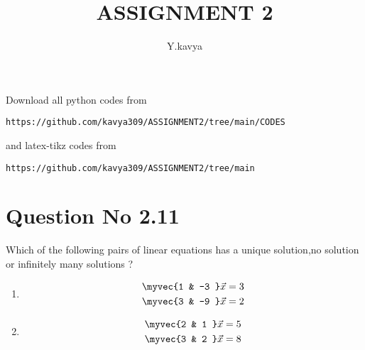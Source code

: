 \documentclass[journal,12pt,twocolumn]{IEEEtran}
\begin{document}
     \def\rightbox#1{\makebox[0in][r]{#1}}
     \def\centbox#1{\makebox[0in]{#1}}
     \def\topbox#1{\raisebox{-\baselineskip}[0in][0in]{#1}}
     \def\midbox#1{\raisebox{-0.5\baselineskip}[0in][0in]{#1}}
\vspace{3cm}
\title{ASSIGNMENT 2}
\author{Y.kavya}
\maketitle
\newpage
\bigskip
\renewcommand{\thefigure}{\theenumi}
\renewcommand{\thetable}{\theenumi}
Download all python codes from 
\begin{lstlisting}
https://github.com/kavya309/ASSIGNMENT2/tree/main/CODES
\end{lstlisting}
%
and latex-tikz codes from 
%
\begin{lstlisting}
https://github.com/kavya309/ASSIGNMENT2/tree/main
\end{lstlisting}
%
\section{Question No 2.11}
Which of the following pairs of linear equations has a unique solution,no solution or infinitely many solutions ?
%
\begin{enumerate}
\item
\begin{align}
\begin{split}
\myvec{1 & -3 }\vec{x}&=3
\\
\myvec{3 & -9 }\vec{x}&=2 \label{1.0.1}
\end{split}
\end{align}
\item
\begin{align}
\begin{split}
\myvec{2 & 1 }\vec{x}&=5
\\
\myvec{3 & 2 }\vec{x}&=8 \label{1.0.2}
\end{split}
\end{align}
\end{enumerate}
%
\end{document}
